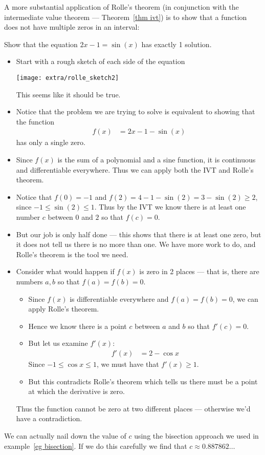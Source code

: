 A more substantial application of Rolle's theorem (in conjunction with the intermediate
value theorem --- Theorem~\ref{thm ivt}) is to show that a function does not have
multiple zeros in an interval:
\begin{eg}
Show that the equation $2x-1=\sin(x)$ has exactly 1 solution.
\begin{itemize}
\item Start with a rough sketch of each side of the equation
\begin{efig}
\begin{center}
 \texttt{[image: extra/rolle\_sketch2]}
\end{center}
\end{efig}
This seems like it should be true.

\item Notice that the problem we are trying to solve is equivalent to showing
that the function
\begin{align*}
  f(x) &= 2x-1-\sin(x)
\end{align*}
has only a single zero.
\item Since $f(x)$ is the sum of a polynomial and a sine function, it is continuous and
differentiable everywhere. Thus we can apply both the IVT and Rolle's theorem.
\item Notice that $f(0)=-1$ and $f(2) = 4-1-\sin(2) = 3-\sin(2) \geq 2$, since $-1\leq
\sin(2) \leq 1$. Thus by the IVT we know there is at least one number $c$ between $0$ and
$2$ so that $f(c)=0$.

\item But our job is only half done --- this shows that there is at least one zero, but
it does not tell us there is no more than one. We have more work to do, and Rolle's
theorem is the tool we need.

\item Consider what would happen if $f(x)$ is zero in 2 places --- that is, there are
numbers $a,b$ so that $f(a)=f(b)=0$.
\begin{itemize}
 \item Since $f(x)$ is differentiable everywhere and $f(a)=f(b)=0$, we can apply Rolle's
theorem.
\item Hence we know there is a point $c$ between $a$ and $b$ so that $f'(c)=0$.
\item But let us examine $f'(x)$:
\begin{align*}
  f'(x) &= 2- \cos x
\end{align*}
Since $-1\leq \cos x \leq 1$, we must have that $f'(x) \geq 1$.
\item But this contradicts Rolle's theorem which tells us there must be a point at which
the derivative is zero.
\end{itemize}
Thus the function cannot be zero at two different places --- otherwise we'd have a
contradiction.
\end{itemize}
We can actually nail down the value of $c$ using the bisection approach we used in
example~\ref{eg bisection}. If we do this carefully we find that $c \approx
0.887862\dots$

\end{eg}


